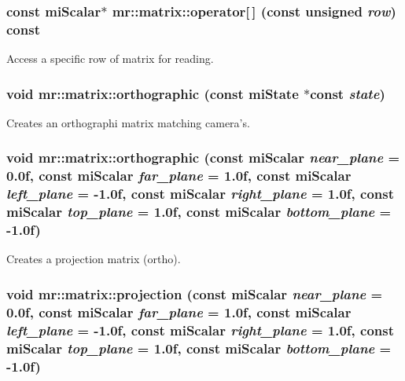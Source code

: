 \subsubsection{\setlength{\rightskip}{0pt plus 5cm}const mi\-Scalar$\ast$ mr::matrix::operator[$\,$] (const unsigned {\em row}) const\hspace{0.3cm}{\tt  [inline]}}\label{classmr_1_1matrix_z22_1}


Access a specific row of matrix for reading. 

\subsubsection{\setlength{\rightskip}{0pt plus 5cm}void mr::matrix::orthographic (const mi\-State $\ast$const {\em state})\hspace{0.3cm}{\tt  [inline]}}\label{classmr_1_1matrix_z23_13}


Creates an orthographi matrix matching camera's. 

\subsubsection{\setlength{\rightskip}{0pt plus 5cm}void mr::matrix::orthographic (const mi\-Scalar {\em near\_\-plane} = 0.0f, const mi\-Scalar {\em far\_\-plane} = 1.0f, const mi\-Scalar {\em left\_\-plane} = -1.0f, const mi\-Scalar {\em right\_\-plane} = 1.0f, const mi\-Scalar {\em top\_\-plane} = 1.0f, const mi\-Scalar {\em bottom\_\-plane} = -1.0f)\hspace{0.3cm}{\tt  [inline]}}\label{classmr_1_1matrix_z23_12}


Creates a projection matrix (ortho). 

\subsubsection{\setlength{\rightskip}{0pt plus 5cm}void mr::matrix::projection (const mi\-Scalar {\em near\_\-plane} = 0.0f, const mi\-Scalar {\em far\_\-plane} = 1.0f, const mi\-Scalar {\em left\_\-plane} = -1.0f, const mi\-Scalar {\em right\_\-plane} = 1.0f, const mi\-Scalar {\em top\_\-plane} = 1.0f, const mi\-Scalar {\em bottom\_\-plane} = -1.0f)\hspace{0.3cm}{\tt  [inline]}}\label{classmr_1_1matrix_z23_15}



